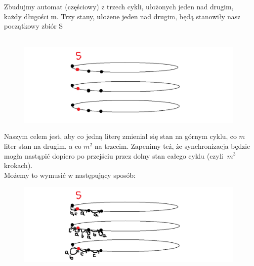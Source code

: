 \documentclass[a4paper,11pt]{article}
\begin{document}
Zbudujmy automat (częściowy) z trzech cykli, ułożonych jeden nad drugim, każdy długości m. Trzy stany, ułożene jeden nad
drugim, będą stanowiły nasz początkowy zbiór S \\ \\

\begin{figure}[h!]
  \centerline{%
    \includegraphics[width=18cm]{zad42.png}%
  }%
\end{figure}

Naszym celem jest, aby co jedną literę zmieniał się stan na górnym cyklu, co $m$ liter stan na drugim, a co $m^2$ na trzecim.
Zapenimy też, że synchronizacja będzie mogła nastąpić dopiero po przejściu przez dolny stan całego cyklu (czyli $~m^3$ krokach). \\
Możemy to wymusić w następujący sposób: \\

\begin{figure}[h!]
  \centerline{%
    \includegraphics[width=18cm]{zad42_2.png}%
  }%
\end{figure}
\end{document}
